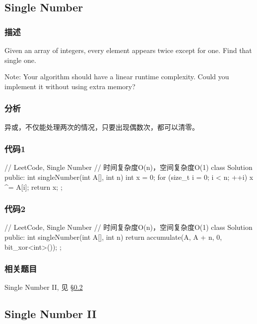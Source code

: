 \subsection{Single Number} %
\label{sec:single-number}


\subsubsection{描述}
Given an array of integers, every element appears twice except for one. Find that single one.

Note:
Your algorithm should have a linear runtime complexity. Could you implement it without using extra memory?


\subsubsection{分析}
异或，不仅能处理两次的情况，只要出现偶数次，都可以清零。


\subsubsection{代码1}
\begin{Code}
// LeetCode, Single Number
// 时间复杂度O(n)，空间复杂度O(1)
class Solution {
public:
    int singleNumber(int A[], int n) {
        int x = 0;
        for (size_t i = 0; i < n; ++i)
            x ^= A[i];
        return x;
    }
};
\end{Code}


\subsubsection{代码2}
\begin{Code}
// LeetCode, Single Number
// 时间复杂度O(n)，空间复杂度O(1)
class Solution {
public:
    int singleNumber(int A[], int n) {
        return accumulate(A, A + n, 0, bit_xor<int>());
    }
};
\end{Code}


\subsubsection{相关题目}
\begindot
\item  Single Number II, 见 \S \ref{sec:single-number-ii}
\myenddot


\subsection{Single Number II} %
\label{sec:single-number-ii}



